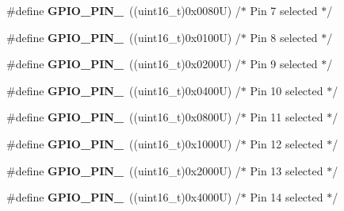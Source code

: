 \begin{DoxyCompactItemize}
\item 
\mbox{\label{group___g_p_i_o__pins_ga482cb86c2f036e630661a41e8986bcfe}} 
\#define {\bfseries G\+P\+I\+O\+\_\+\+P\+I\+N\+\_}~((uint16\+\_\+t)0x0080\+U)  /$\ast$ Pin 7 selected    $\ast$/
\item 
\mbox{\label{group___g_p_i_o__pins_gaf5eb6a42a4428e236bd4fd08ade71e7a}} 
\#define {\bfseries G\+P\+I\+O\+\_\+\+P\+I\+N\+\_}~((uint16\+\_\+t)0x0100\+U)  /$\ast$ Pin 8 selected    $\ast$/
\item 
\mbox{\label{group___g_p_i_o__pins_ga4c503cb4a0dc0d18261080051d9c2daf}} 
\#define {\bfseries G\+P\+I\+O\+\_\+\+P\+I\+N\+\_}~((uint16\+\_\+t)0x0200\+U)  /$\ast$ Pin 9 selected    $\ast$/
\item 
\mbox{\label{group___g_p_i_o__pins_gac102c0123cb8bcadc5b590cd940b9e20}} 
\#define {\bfseries G\+P\+I\+O\+\_\+\+P\+I\+N\+\_}~((uint16\+\_\+t)0x0400\+U)  /$\ast$ Pin 10 selected   $\ast$/
\item 
\mbox{\label{group___g_p_i_o__pins_ga79f6797ea82c1fb25cd6c0e14e44d312}} 
\#define {\bfseries G\+P\+I\+O\+\_\+\+P\+I\+N\+\_}~((uint16\+\_\+t)0x0800\+U)  /$\ast$ Pin 11 selected   $\ast$/
\item 
\mbox{\label{group___g_p_i_o__pins_ga95f9ce5911fa8b209defb969db93ced3}} 
\#define {\bfseries G\+P\+I\+O\+\_\+\+P\+I\+N\+\_}~((uint16\+\_\+t)0x1000\+U)  /$\ast$ Pin 12 selected   $\ast$/
\item 
\mbox{\label{group___g_p_i_o__pins_ga173023dced8f9692ade0f1176558ef70}} 
\#define {\bfseries G\+P\+I\+O\+\_\+\+P\+I\+N\+\_}~((uint16\+\_\+t)0x2000\+U)  /$\ast$ Pin 13 selected   $\ast$/
\item 
\mbox{\label{group___g_p_i_o__pins_ga315b4dc1a0c1f9021b3d3a8fe9ccc0c3}} 
\#define {\bfseries G\+P\+I\+O\+\_\+\+P\+I\+N\+\_}~((uint16\+\_\+t)0x4000\+U)  /$\ast$ Pin 14 selected   $\ast$/
\item 
\mbox{\label{group___g_p_i_o__pins_ga77be5756e80bcdf18e1aa39b35d1d640}} 

\end{DoxyCompactItemize}
